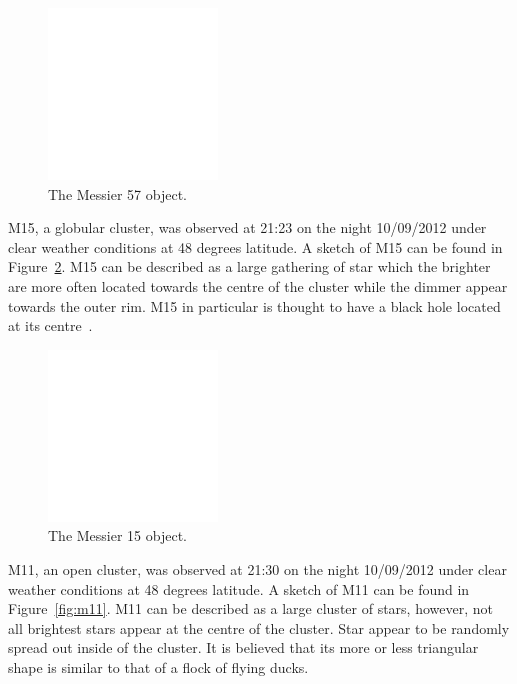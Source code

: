 \documentclass{article}
\begin{document}
\begin{figure}[h]
\centering
\includegraphics[width=0.4\textwidth]{images/blank}
\caption{The Messier 57 object.\label{fig:m57}}
\end{figure}

M15, a globular cluster, was observed at 21:23 on the night 10/09/2012 under clear weather conditions at 48 degrees latitude. A sketch
of M15 can be found in Figure~\ref{fig:m15}. M15 can be described as a large gathering of star which the brighter are more often 
located towards the centre of the cluster while the dimmer appear towards the outer rim. M15 in particular is thought to have a 
black hole located at its centre~\cite{Marel:2003}.

\begin{figure}[h!]
\centering
\includegraphics[width=0.4\textwidth]{images/blank}
\caption{The Messier 15 object.\label{fig:m15}}
\end{figure}

M11, an open cluster, was observed at 21:30 on the night 10/09/2012 under clear weather conditions at 48 degrees latitude. A sketch
of M11 can be found in Figure~\ref{fig:m11}. M11 can be described as a large cluster of stars, however, not all brightest stars appear
at the centre of the cluster. Star appear to be randomly spread out inside of the cluster. It is believed that its more or less triangular
shape is similar to that of a flock of flying ducks.
\end{document}
